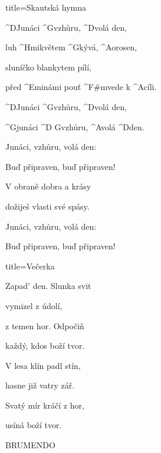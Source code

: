 \begin{song}{title=\predtitle \centering Skautská hymna \\\normalsize  \vspace*{-0.3cm}}  %
\begin{centerjustified}
\nejvetsi

	^{D}Junáci ^{G}vzhůru, ^{D}volá den,

	luh ^{Hmi}květem ^{G}kývá, ^{A}orosen,

	sluníčko blankytem pílí,

	před ^{Emi}námi pouť ^{F#m}vede k ^{A}cíli.

	^{D}Junáci ^{G}vzhůru, ^{D}volá den,

	^{G}junáci ^{D G}vzhůru, ^{A}volá ^{D}den. 

\phantom{.}

	Junáci, vzhůru, volá den:

	Buď připraven, buď připraven!
	
	V obraně dobra a krásy

	dožiješ vlasti své spásy.

	Junáci, vzhůru, volá den:
	
	Buď připraven, buď připraven!
\end{centerjustified}
\setcounter{Slokočet}{0}
\end{song}

\vspace*{4cm}
\begin{song}{title=\predtitle \centering Večerka \vspace*{-0.3cm}}
	\begin{centerjustified}
\nejvetsi

	\sloka
	Zapad' den. Slunka svit

	vymizel z údolí,

	z temen hor. Odpočiň

	každý, kdos boží tvor.

	\sloka
	V lesa klín padl stín,

	hasne již vatry zář.

	Svatý mír kráčí z hor,

	usíná boží tvor.

	\sloka
	BRUMENDO
\end{centerjustified}
\setcounter{Slokočet}{0}
\end{song}

